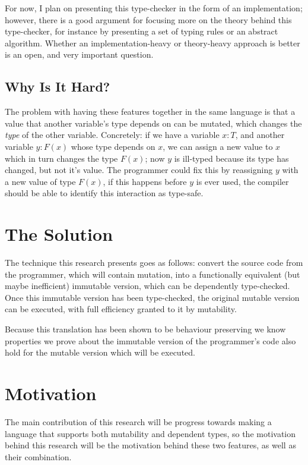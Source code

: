 \documentclass[12pt,twoside]{report}
\begin{document}
For now, I plan on presenting this type-checker in the form of an implementation; however, there is a good argument for focusing more on the theory behind this type-checker, for instance by presenting a set of typing rules or an abstract algorithm. Whether an implementation-heavy or theory-heavy approach is better is an open, and very important question.

\subsection{Why Is It Hard?}
The problem with having these features together in the same language is that a value that another variable's type depends on can be mutated, which changes the \textit{type} of the other variable. Concretely: if we have a variable $x: T$, and another variable $y: F(x)$ whose type depends on $x$, we can assign a new value to $x$ which in turn changes the type $F(x)$; now $y$ is ill-typed because its type has changed, but not it's value. The programmer could fix this by reassigning $y$ with a new value of type $F(x)$, if this happens before $y$ is ever used, the compiler should be able to identify this interaction as type-safe.

\section{The Solution}
\label{thesolution}
The technique this research presents goes as follows: convert the source code from the programmer, which will contain mutation, into a functionally equivalent (but maybe inefficient) immutable version, which can be dependently type-checked. Once this immutable version has been type-checked, the original mutable version can be executed, with full efficiency granted to it by mutability.

Because this translation has been shown to be behaviour preserving\citep{ullrich_electrolysis_nodate} we know properties we prove about the immutable version of the programmer's code also hold for the mutable version which will be executed.

\section{Motivation}
The main contribution of this research will be progress towards making a language that supports both mutability and dependent types, so the motivation behind this research will be the motivation behind these two features, as well as their combination.
\end{document}
